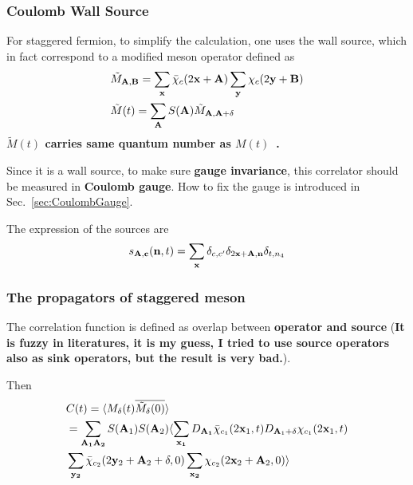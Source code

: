 \subsubsection{\label{CoulombWallSource}Coulomb Wall Source}

For staggered fermion, to simplify the calculation, one uses the wall source, which in fact correspond to a modified meson operator defined as
\begin{equation}
\begin{split}
&\tilde{M}_{{\bf A},{\bf B}}= \sum _{\bf x}\bar{\chi}_c(2{\bf x}+{\bf A}) \sum _{\bf y}\chi _c (2{\bf y}+{\bf B})\\
&\tilde{M}(t) = \sum _{\bf A} S({\bf A})\tilde{M}_{{\bf A},{\bf A}+\delta}
\end{split}
\end{equation}
\textbf{\textcolor[rgb]{0,0,1}{$\tilde{M}(t)$ carries same quantum number as $M(t)$~\cite{staggeredMeson}.}}

Since it is a wall source, to make sure \textbf{gauge invariance}, this correlator should be measured in \textcolor[rgb]{0,0,1}{\textbf{Coulomb gauge}}. How to fix the gauge is introduced in Sec.~\ref{sec:CoulombGauge}.

The expression of the sources are
\begin{equation}
\begin{split}
&s_{\bf A,c}({\bf n}, t) = \sum _{{\bf x}} \delta _{c,c'}\delta _{2{\bf x}+{\bf A},{\bf n}}\delta _{t,n_4}\\
\end{split}
\end{equation}

\subsubsection{\label{ThePropagatorsOfStaggeredMeson}The propagators of staggered meson}

The correlation function is defined as overlap between \textbf{operator and source} (\textcolor[rgb]{1,0,0}{\textbf{It is fuzzy in literatures, it is my guess, I tried to use source operators also as sink operators, but the result is very bad.}}).

Then
\begin{equation}
\begin{split}
&C(t)=\langle M_{\delta}(t) \overline{\tilde{M} _{\delta}(0)}\rangle \\
&= \sum _{\bf A _1 A_2}S({\bf A}_1)S({\bf A}_2)\langle \sum _{\bf x _1}D_{\bf A_1}\bar{\chi}_{c_1}(2{\bf x}_1,t)D_{{\bf A}_1+\delta}\chi _{c_1} (2{\bf x}_1,t) \\
& \sum _{\bf y_2}\bar{\chi} _{c_2} (2{\bf y}_2+{\bf A}_2+\delta,0) \sum _{\bf x _2} \chi_{c_2}(2{\bf x}_2+{\bf A}_2,0)\rangle\\
\end{split}
\end{equation}





